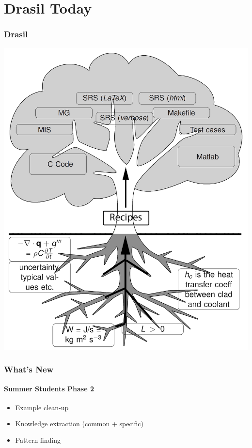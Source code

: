 \documentclass{beamer}
\begin{document}
\section[Drasil]{Drasil Today}


\begin{frame}

\frametitle{Drasil}
\begin{center}
\includegraphics[width=.65\textwidth]{tree.png}
\end{center}

\end{frame}


\begin{frame}

\frametitle{What's New}
\framesubtitle{Summer Students Phase 2}

\begin{itemize}
	\item Example clean-up
	\item Knowledge extraction (common + specific)
	\item Pattern finding
\end{itemize}

\end{frame}

\end{document}
